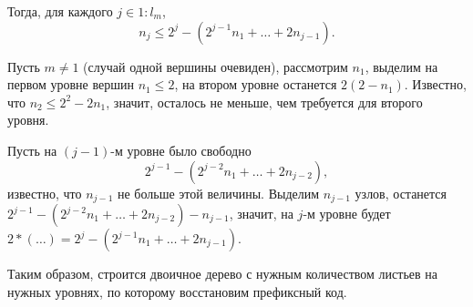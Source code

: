 Тогда, для каждого $j\in 1:l_{m}$, $$n_{j} \leqslant 2^{j} - (2^{j-1}n_{1} +\ldots + 2 n_{j-1}).$$

Пусть $m \neq 1$ (случай одной вершины очевиден), рассмотрим $n_{1}$, выделим на первом уровне вершин $n_{1} \leqslant 2$, на втором уровне останется $2(2 - n_{1})$. Известно, что $n_{2} \leqslant 2^{2} - 2n_{1}$, значит, осталось не меньше, чем требуется для второго уровня.

Пусть на $(j-1)$-м уровне было свободно $$2^{j-1} - (2^{j-2} n_{1} +\ldots + 2 n_{j-2}),$$ известно, что $n_{j-1}$ не больше этой величины. Выделим $n_{j-1}$ узлов, останется $2^{j-1} - (2^{j-2} n_{1} +\ldots + 2 n_{j-2}) - n_{j-1}$, значит, на $j$-м уровне будет $2*(\ldots) =2^{j} - (2^{j-1}n_{1} +\ldots + 2 n_{j-1})$.

Таким образом, строится двоичное дерево с нужным количеством листьев на нужных уровнях, по которому восстановим префиксный код.